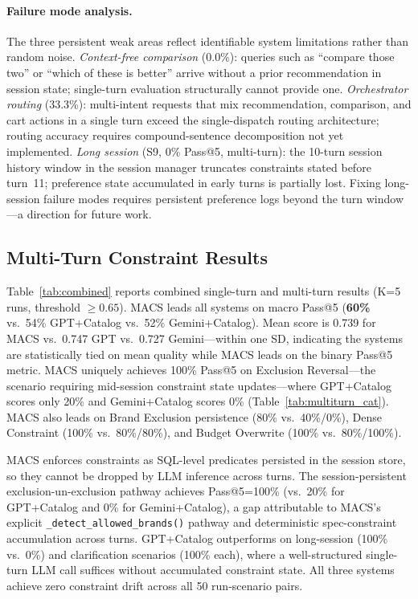 \documentclass[sigconf,anonymous]{acmart}
\newcommand{\GPTCatalog}{GPT\allowbreak{}+\allowbreak{}Catalog}
\newcommand{\GeminiCatalog}{Gemini\allowbreak{}+\allowbreak{}Catalog}
\begin{document}
\paragraph{Failure mode analysis.}
The three persistent weak areas reflect identifiable system limitations rather than
random noise.
\emph{Context-free comparison} (0.0\%): queries such as ``compare those two'' or
``which of these is better'' arrive without a prior recommendation in session state;
single-turn evaluation structurally cannot provide one.
\emph{Orchestrator routing} (33.3\%): multi-intent requests that mix recommendation,
comparison, and cart actions in a single turn exceed the single-dispatch routing
architecture; routing accuracy requires compound-sentence decomposition not yet
implemented.
\emph{Long session} (S9, 0\% Pass@5, multi-turn): the 10-turn session history window
in the session manager truncates constraints stated before turn~11; preference state
accumulated in early turns is partially lost.
Fixing long-session failure modes requires persistent preference
logs beyond the turn window---a direction for future work.

\subsection{Multi-Turn Constraint Results}
\label{sec:multiturn-results}

Table~\ref{tab:combined} reports combined single-turn and multi-turn results
(K=5 runs, threshold $\geq 0.65$). MACS leads all systems on macro Pass@5
(\textbf{60\%} vs.\ 54\% \GPTCatalog{} vs.\ 52\% \GeminiCatalog{}).
Mean score is 0.739 for MACS vs.\ 0.747 GPT vs.\ 0.727 Gemini---within one SD,
indicating the systems are statistically tied on mean quality while MACS
leads on the binary Pass@5 metric.
MACS uniquely achieves 100\% Pass@5 on Exclusion Reversal---the
scenario requiring mid-session constraint state updates---where
\GPTCatalog{} scores only 20\% and \GeminiCatalog{} scores 0\%
(Table~\ref{tab:multiturn_cat}). MACS also leads on Brand Exclusion
persistence (80\% vs.\ 40\%/0\%), Dense Constraint (100\% vs.\ 80\%/80\%),
and Budget Overwrite (100\% vs.\ 80\%/100\%).

MACS enforces constraints as SQL-level predicates persisted in the session
store, so they cannot be dropped by LLM inference across turns.
The session-persistent exclusion-un-exclusion pathway achieves Pass@5=100\%
(vs.\ 20\% for \GPTCatalog{} and 0\% for \GeminiCatalog{}), a
gap attributable to MACS's explicit \texttt{\_detect\_allowed\_brands()}
pathway and deterministic spec-constraint accumulation across turns.
\GPTCatalog{} outperforms on long-session (100\% vs.\ 0\%) and
clarification scenarios (100\% each), where a well-structured single-turn
LLM call suffices without accumulated constraint state. All three systems
achieve zero constraint drift across all 50 run-scenario pairs.
\end{document}
